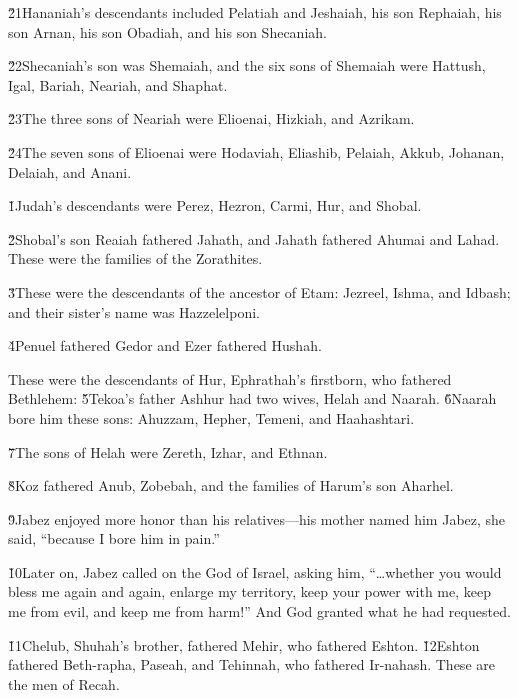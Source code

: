 \v{21}Hananiah's descendants included Pelatiah and Jeshaiah, his son Rephaiah, his son Arnan, his son Obadiah, and his son Shecaniah.

\v{22}Shecaniah's son was Shemaiah, and the six sons of Shemaiah were Hattush, Igal, Bariah, Neariah, and Shaphat.

\v{23}The three sons of Neariah were Elioenai, Hizkiah, and Azrikam.

\v{24}The seven sons of Elioenai were Hodaviah, Eliashib, Pelaiah, Akkub, Johanan, Delaiah, and Anani.

\v{1}Judah's descendants were Perez, Hezron, Carmi, Hur, and Shobal.

\v{2}Shobal's son Reaiah fathered Jahath, and Jahath fathered Ahumai and Lahad. These were the families of the Zorathites.

\v{3}These were the descendants of the ancestor of Etam: Jezreel, Ishma, and Idbash; and their sister's name was Hazzelelponi.

\v{4}Penuel fathered Gedor and Ezer fathered Hushah.

These were the descendants of Hur, Ephrathah's firstborn, who fathered Bethlehem: \v{5}Tekoa's father Ashhur had two wives, Helah and Naarah. \v{6}Naarah bore him these sons: Ahuzzam, Hepher, Temeni, and Haahashtari.

\v{7}The sons of Helah were Zereth, Izhar, and Ethnan.

\v{8}Koz fathered Anub, Zobebah, and the families of Harum's son Aharhel.

\v{9}Jabez enjoyed more honor than his relatives---his mother named him Jabez, she said, ``because I bore him in pain.''

\v{10}Later on, Jabez called on the God of Israel, asking him, ``{\ldots}whether you would bless me again and again, enlarge my territory, keep your power with me, keep me from evil, and keep me from harm!'' And God granted what he had requested.

\v{11}Chelub, Shuhah's brother, fathered Mehir, who fathered Eshton. \v{12}Eshton fathered Beth-rapha, Paseah, and Tehinnah, who fathered Ir-nahash. These are the men of Recah.

